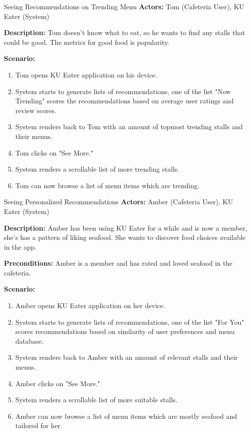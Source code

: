 \begin{usecase}{Seeing Recommendations on Trending Menu}
    \textbf{Actors:} Tom (Cafeteria User), KU Eater (System)
    
    \textbf{Description:} Tom doesn't know what to eat, so he wants to find any stalls that could be good. The metrics
    for good food is popularity.

    \textbf{Scenario:}

    \begin{enumerate}[leftmargin=80pt]
        \item Tom opens KU Eater application on his device.
        \item System starts to generate lists of recommendations, one of the list "Now Trending" scores the recommendations
        based on average user ratings and review scores.
        \item System renders back to Tom with an amount of topmost trending stalls and their menus.
        \item Tom clicks on "See More."
        \item System renders a scrollable list of more trending stalls.
        \item Tom can now browse a list of menu items which are trending.
    \end{enumerate}
\end{usecase}

\begin{usecase}{Seeing Personalized Recommendations}
    \textbf{Actors:} Amber (Cafeteria User), KU Eater (System)
    
    \textbf{Description:} Amber has been using KU Eater for a while and is now a member, she's has a pattern of liking seafood.
    She wants to discover food choices available in the app.

    \textbf{Preconditions:} Amber is a member and has rated and loved seafood in the cafeteria.

    \textbf{Scenario:}

    \begin{enumerate}[leftmargin=80pt]
        \item Amber opens KU Eater application on her device.
        \item System starts to generate lists of recommendations, one of the list "For You" scores recommendations
        based on similarity of user preferences and menu database.
        \item System renders back to Amber with an amount of relevant stalls and their menus.
        \item Amber clicks on "See More."
        \item System renders a scrollable list of more suitable stalls.
        \item Amber can now browse a list of menu items which are mostly seafood and tailored for her.
    \end{enumerate}
\end{usecase}

